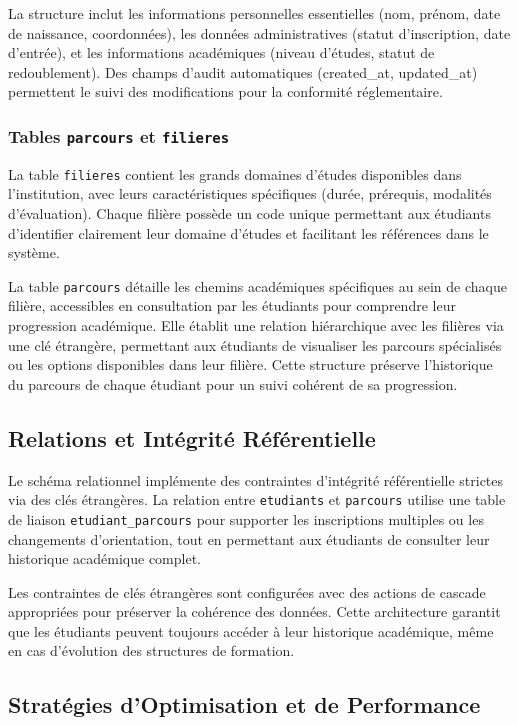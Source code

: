 \documentclass[12pt,a4paper]{report}
\begin{document}
La structure inclut les informations personnelles essentielles (nom, prénom, date de naissance, coordonnées), les données administratives (statut d'inscription, date d'entrée), et les informations académiques (niveau d'études, statut de redoublement). Des champs d'audit automatiques (created\_at, updated\_at) permettent le suivi des modifications pour la conformité réglementaire.

\subsubsection{Tables \texttt{parcours} et \texttt{filieres}}

La table \texttt{filieres} contient les grands domaines d'études disponibles dans l'institution, avec leurs caractéristiques spécifiques (durée, prérequis, modalités d'évaluation). Chaque filière possède un code unique permettant aux étudiants d'identifier clairement leur domaine d'études et facilitant les références dans le système.

La table \texttt{parcours} détaille les chemins académiques spécifiques au sein de chaque filière, accessibles en consultation par les étudiants pour comprendre leur progression académique. Elle établit une relation hiérarchique avec les filières via une clé étrangère, permettant aux étudiants de visualiser les parcours spécialisés ou les options disponibles dans leur filière. Cette structure préserve l'historique du parcours de chaque étudiant pour un suivi cohérent de sa progression.

\subsection{Relations et Intégrité Référentielle}

Le schéma relationnel implémente des contraintes d'intégrité référentielle strictes via des clés étrangères. La relation entre \texttt{etudiants} et \texttt{parcours} utilise une table de liaison \texttt{etudiant\_parcours} pour supporter les inscriptions multiples ou les changements d'orientation, tout en permettant aux étudiants de consulter leur historique académique complet.

Les contraintes de clés étrangères sont configurées avec des actions de cascade appropriées pour préserver la cohérence des données. Cette architecture garantit que les étudiants peuvent toujours accéder à leur historique académique, même en cas d'évolution des structures de formation.

\subsection{Stratégies d'Optimisation et de Performance}
\end{document}
